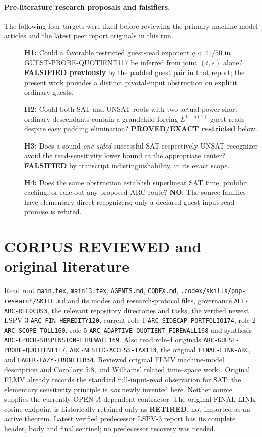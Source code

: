 \documentclass[11pt]{article}
\begin{document}
\paragraph{Pre-literature research proposals and falsifiers.}
The following four targets were fixed before reviewing the primary
machine-model articles and the latest peer report originals in this run.
\begin{description}
\item[] \textbf{H1:} Could a favorable restricted guest-read exponent
$q<41/50$ in GUEST-PROBE-QUOTIENT117 be inferred from joint $(t,s)$
alone? \textbf{FALSIFIED previously} by the padded guest pair in
that report; the present work provides a distinct pivotal-input
obstruction on explicit ordinary guests.
\item[] \textbf{H2:} Could both SAT and UNSAT roots with two actual
power-short ordinary descendants contain a grandchild forcing
$L^{1-o(1)}$ guest reads despite easy padding elimination?
\textbf{PROVED/EXACT restricted} below.
\item[] \textbf{H3:} Does a sound \emph{one-sided} successful SAT
respectively UNSAT recognizer avoid the read-sensitivity lower bound
at the appropriate center? \textbf{FALSIFIED} by transcript
indistinguishability, in its exact scope.
\item[] \textbf{H4:} Does the same obstruction establish superlinear
SAT time, prohibit caching, or rule out any proposed ARC route?
\textbf{NO}. The source families have elementary direct recognizers;
only a declared guest-input-read promise is refuted.
\end{description}

\section{CORPUS REVIEWED and original literature}
Read root \texttt{main.tex}, \texttt{main13.tex},
\texttt{AGENTS.md}, \texttt{CODEX.md},
\texttt{.codex/skills/pnp-research/SKILL.md} and its modes and
research-protocol files, governance \texttt{ALL-ARC-REFOCUS3},
the relevant repository directories and tasks, the verified newest
LSPV-3 \texttt{ARC-PIN-HEREDITY120}, current role-1
\texttt{ARC-SIDECAP-PORTFOLIO174}, role-2 \texttt{ARC-SCOPE-TOLL160},
role-5 \texttt{ARC-ADAPTIVE-QUOTIENT-FIREWALL168} and synthesis
\texttt{ARC-EPOCH-SUSPENSION-FIREWALL169}. Also read role-4 originals
\texttt{ARC-GUEST-PROBE-QUOTIENT117},
\texttt{ARC-NESTED-ACCESS-TAX113}, the original
\texttt{FINAL-LINK-ARC}, and
\texttt{EAGER-LAZY-FRONTIER34}. Reviewed original FLMV
machine-model description and Corollary 5.8, and Williams' related
time--space work \cite{FLMV,Williams}. Original FLMV already records
the standard full-input-read observation for SAT: the elementary
sensitivity principle is \emph{not} newly invented here.
Neither source supplies the currently OPEN $A$-dependent contractor.
The original FINAL-LINK cosine endpoint is historically retained
only as \textbf{RETIRED}, not imported as an active theorem.
Latest verified predecessor LSPV-3 report has its complete header,
body and final sentinel; no predecessor recovery was needed.
\end{document}
